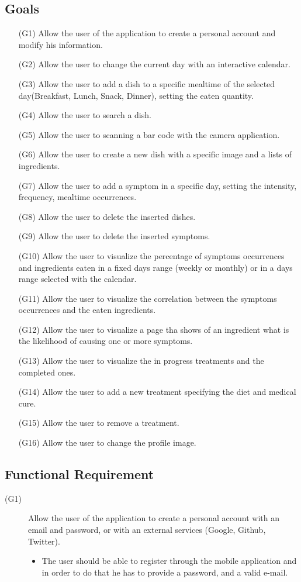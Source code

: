 \documentclass [12pt]{article}
\begin{document}
\subsection{Goals}
\begin{enumerate}
\item[(G1)]Allow the user of the application to create a personal account and modify his information.
\item[(G2)]Allow the user to change the current day with an interactive calendar.
\item[(G3)]Allow the user to add a dish to a specific mealtime of the selected day(Breakfast, Lunch, Snack, Dinner), setting the eaten quantity.
\item[(G4)]Allow the user to search a dish.
\item[(G5)]Allow the user to scanning a bar code with the camera application.
\item[(G6)]Allow the user to create a new dish with a specific image and a lists of ingredients. 
\item[(G7)]Allow the user to add a symptom in a specific day, setting the intensity, frequency, mealtime occurrences.
\item[(G8)]Allow the user to delete the inserted dishes.
\item[(G9)]Allow the user to delete the inserted symptoms.
\item[(G10)]Allow the user to visualize the percentage of symptoms occurrences and ingredients eaten in a fixed days range (weekly or monthly) or in a days range selected with the calendar.
\item[(G11)]Allow the user to visualize the correlation between the symptoms occurrences and the eaten ingredients.
\item[(G12)]Allow the user to visualize a page tha shows of an ingredient what is the likelihood of causing one or more symptoms.
\item[(G13)]Allow the user to visualize the in progress treatments and the completed ones.
\item[(G14)]Allow the user to add a new treatment specifying the diet and medical cure.
\item[(G15)]Allow the user to remove a treatment.
\item[(G16)]Allow the user to change the profile image.


\end{enumerate}
\subsection{Functional Requirement}
\begin{description}
\item[(G1)]Allow the user of the application to create a personal account with an email and password, or with an external services (Google, Github, Twitter).
\begin{itemize}
\item The user should be able to register through the mobile application and in order to do that he has to provide a password, and a valid e-mail.\\
\end{itemize}
\end{description}
\end{document}

